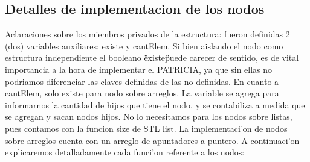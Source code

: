 \subsection{Detalles de implementacion de los nodos}
Aclaraciones sobre los miembros privados de la estructura: fueron definidas 2 (dos) variables auxiliares: existe y cantElem. Si bien aislando el nodo como estructura independiente el booleano \"existe\" puede carecer de sentido, es de vital importancia a la hora de implementar el PATRICIA, ya que sin ellas no podriamos diferenciar las claves definidas de las no definidas. En cuanto a cantElem, solo existe para nodo sobre arreglos. La variable se agrega para informarnos la cantidad de hijos que tiene el nodo, y se contabiliza a medida que se agregan y sacan nodos hijos. No lo necesitamos para los nodos sobre listas, pues contamos con la funcion size de STL list.
La implementaci'on de nodos sobre arreglos cuenta con un arreglo de apuntadores a puntero.
A continuaci'on explicaremos detalladamente cada funci'on referente a los nodos:
